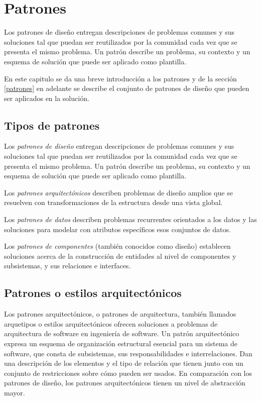 
\chapter{Patrones}

Los patrones de diseño entregan descripciones de problemas comunes y sus soluciones tal que puedan ser reutilizados por la comunidad cada vez que se presenta el mismo problema. Un patrón describe un problema, su contexto y un esquema de solución que puede ser aplicado como plantilla.

En este capitulo se da una breve introducción a los patrones y de la sección \ref{patrones} en adelante se describe el conjunto de patrones de diseño que pueden ser aplicados en la solución.

\section{Tipos de patrones}

Los \textit{patrones de diseño} entregan descripciones de problemas comunes y sus soluciones tal que puedan ser reutilizados por la comunidad cada vez que se presenta el mismo problema. Un patrón describe un problema, su contexto y un esquema de solución que puede ser aplicado como plantilla.

Los \textit{patrones arquitectónicos} describen problemas de diseño amplios que se resuelven con transformaciones de la estructura desde una vista global.

Los \textit{patrones de datos} describen problemas recurrentes orientados a los datos y las soluciones para modelar con atributos específicos esos conjuntos de datos.

Los \textit{patrones de componentes} (también conocidos como diseño) establecen soluciones acerca de la construcción de entidades al nivel de componentes y subsistemas, y sus relaciones e interfaces.

\section{Patrones o estilos arquitectónicos}

Los patrones arquitectónicos, o patrones de arquitectura, también llamados arquetipos o estilos arquitectónicos ofrecen soluciones a problemas de arquitectura de software en ingeniería de software. Un patrón arquitectónico expresa un esquema de organización estructural esencial para un sistema de software, que consta de subsistemas, sus responsabilidades e interrelaciones. Dan una descripción de los elementos y el tipo de relación que tienen junto con un conjunto de restricciones sobre cómo pueden ser usados. En comparación con los patrones de diseño, los patrones arquitectónicos tienen un nivel de abstracción mayor.

